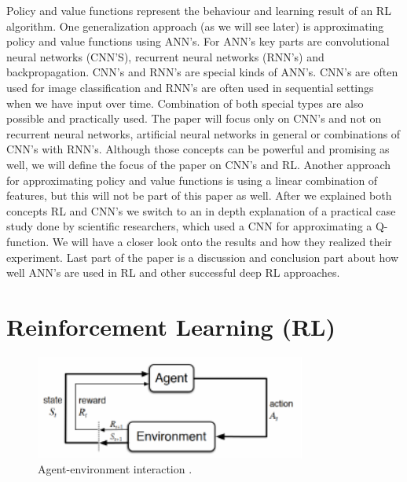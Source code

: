 \documentclass[conference]{IEEEtran}
\begin{document}
Policy and value functions represent the behaviour and learning result of an RL algorithm. One generalization approach (as we will see later) is approximating policy and value functions using ANN's. For ANN's key parts are convolutional neural networks (CNN'S), recurrent neural networks (RNN's) and backpropagation. CNN's and RNN's are special kinds of ANN's. CNN's are often used for image classification and RNN's are often used in sequential settings when we have input over time. Combination of both special types are also possible and practically used. The paper will focus only on CNN's and not on recurrent neural networks, artificial neural networks in general or combinations of CNN's with RNN's. Although those concepts can be powerful and  promising as well, we will define the focus of the paper on CNN's and RL. Another approach for approximating policy and value functions is using a linear combination of features, but this will not be part of this paper as well. After we explained both concepts RL and CNN's we switch to an in depth explanation of a practical case study done by scientific researchers, which used a CNN for approximating a Q-function. We will have a closer look onto the results and how they realized their experiment. Last part of the paper is a discussion and conclusion part about how well ANN's are used in RL and other successful deep RL approaches.  

\section{Reinforcement Learning (RL)}

\begin{figure}[!t]
\centering
\includegraphics[width=3.5in]{agent_environment}
\caption{Agent-environment interaction \cite{sutton_barto_98}.}
\label{fig:agent_environment}
\end{figure}
\end{document}
